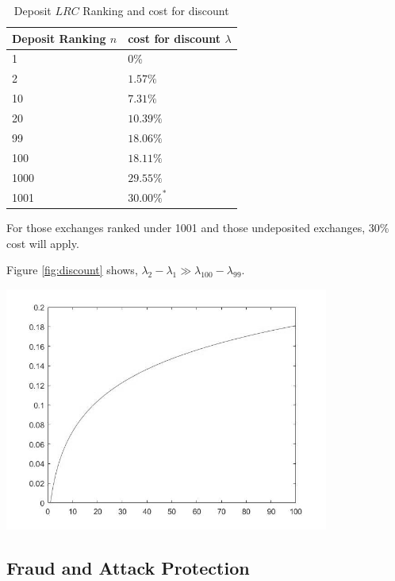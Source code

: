 \documentclass[UTF8,nofonts]{article}
\makeatletter
\newenvironment{figurehere}
 {\def\@captype{figure}}
 {}
\makeatother
\begin{document}
\begin{table}[hbt]
 \centering
\begin{tabular}{p{3.5cm}|p{3cm}} %
Deposit Ranking $n$ & cost for discount $\lambda$ \\ %
  \hline
1 & 0\%\\
\hline
2 & $1.57\%$\\
\hline
10 & $7.31\%$\\
\hline
20 & $10.39\%$\\
\hline
99 &$18.06\%$\\
\hline
100 &$18.11\%$\\
\hline
1000 &$29.55\%$\\
\hline
1001 &$30.00\%^*$\\
 \end{tabular}
\caption{Deposit $LRC$ Ranking and cost for discount} %
\end{table}


For those exchanges ranked under 1001 and those undeposited exchanges, 30\% cost will apply.

Figure \ref{fig:discount} shows, $\lambda_{2} - \lambda_{1} \gg \lambda_{100} - \lambda_{99}$.

\begin{center}
\begin{figurehere}
\includegraphics[height=8cm]{images/exchange-discount.png}

\caption{$LRC$ token deposit rank and cost for discount}
\label{fig:discount}

\end{figurehere}
\end{center}


\subsection{Fraud and Attack Protection}
\end{document}
